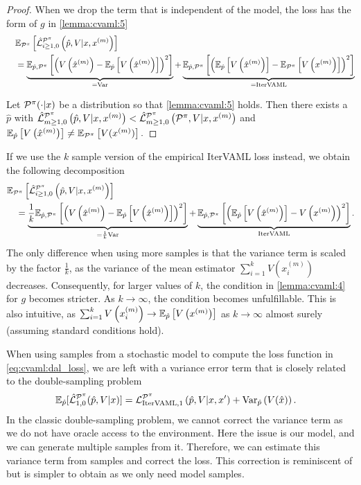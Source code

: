 \begin{proof}
When we drop the term that is independent of the model, the loss has the form of $g$ in \autoref{lemma:cvaml:5}
\begin{align}
   & \EEX{\P^\pi}{\hat{\mathcal{L}}^{\P^\pi}_{i\geq1,0}\left(\hat{p},V|x,x^{(m)}\right)} \\
   \quad & =  \underbrace{\EEX{\hat{p},\P^\pi}{\left(V\left(\hat{x}^{(m)}\right) - \EEX{\hat{p}}{V\left(\hat{x}^{(m)}\right)}\right)^2}}_{= \mathrm{Var}} + \underbrace{\EEX{\hat{p},\P^\pi}{\left(\EEX{\hat{p}}{V\left(\hat{x}^{(m)}\right)} - \EEX{\P^\pi}{V\left(x^{(m)}\right)}\right)^2}}_{= \mathrm{IterVAML}}
\end{align}

 Let $\P^\pi(\cdot|x)$ be a distribution so that \autoref{lemma:cvaml:5} holds. Then there exists a $\hat{p}$ with $\hat{\mathcal{L}}^{\P^\pi}_{m\geq1,0}\left(\hat{p},V|x,x^{(m)}\right) < \hat{\mathcal{L}}^{\P^\pi}_{m\geq1,0}\left(\P^\pi,V|x,x^{(m)}\right)$ and $\EEX{\hat{p}}{V\left(\hat{x}^{(m)}\right)} \neq \EEX{\P^\pi}{V(x^{(m)})}.$
\end{proof}

If we use the $k$ sample version of the empirical IterVAML loss instead, we obtain the following decomposition
\begin{align}
    &\EEX{\P^\pi}{\hat{\mathcal{L}}^{\P^\pi}_{i\geq1,0}\left(\hat{p},V|x,x^{(m)}\right)} \\
    &\quad = \underbrace{\frac{1}{k}\EEX{\hat{p},\P^\pi}{\left(V\left(\hat{x}^{(m)}\right) - \EEX{\hat{p}}{V\left(\hat{x}^{(m)}\right)}\right)^2}}_{=\frac{1}{k} \mathrm{Var}} + \underbrace{\EEX{\hat{p},\P^\pi}{\left(\EEX{\hat{p}}{V\left(\hat{x}^{(m)}\right)} - V\left(x^{(m)}\right)\right)^2}}_{\mathrm{IterVAML}}.
\end{align}
The only difference when using more samples is that the variance term is scaled by the factor $\frac{1}{k}$, as the variance of the mean estimator $\sum_{i=1}^k V\left(x^{(m)}_i\right)$ decreases.
Consequently, for larger values of $k$, the condition in \autoref{lemma:cvaml:4} for $g$ becomes stricter.
As $k \rightarrow \infty$, the condition becomes unfulfillable. 
This is also intuitive, as $\sum_{i=1}^k V\left(x^{(m)}_i\right) \rightarrow \EEX{\hat{p}}{V\left(x^{(m)}\right)}$ as $k \rightarrow \infty$ almost surely (assuming standard conditions hold).


When using samples from a stochastic model to compute the loss function in \autoref{eq:cvaml:dal_loss}, we are left with a variance error term that is closely related to the double-sampling problem
\begin{align}
 &\mathbb{E}_{\hat{p}}[\hat{\mathcal{L}}^{\P^\pi}_{1,0}(\hat{p},V|x)] = {\mathcal{L}}^{\P^\pi}_{\mathrm{IterVAML}, 1}\left(\hat{p},V|x,x'\right) + \mathrm{Var}_{\hat{p}}\left(V(\hat{x})\right).
\end{align}
In the classic double-sampling problem, we cannot correct the variance term as we do not have oracle access to the environment.
Here the issue is our model, and we can generate multiple samples from it.
Therefore, we can estimate this variance term from samples and correct the loss.
This correction is reminiscent of \textcite{antos2008learning} but is simpler to obtain as we only need model samples.

